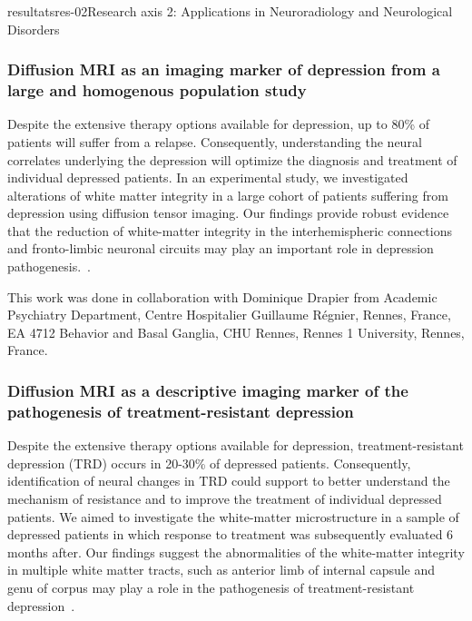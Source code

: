 \documentclass{ra2018}
\begin{document}
\begin{module}{resultats}{res-02}{Research axis 2: Applications in Neuroradiology and Neurological Disorders}
\subsubsection{Diffusion MRI as an imaging marker of depression from a large and homogenous population study}
\begin{participants}
\end{participants}
Despite the extensive therapy options available for depression, up to 80\% of patients will suffer from a relapse. Consequently, understanding the neural correlates underlying the depression will optimize the diagnosis and treatment of individual depressed patients. In an experimental study, we investigated alterations of white matter integrity in a large cohort of patients suffering from depression using diffusion tensor imaging. Our findings provide robust evidence that the reduction of white-matter integrity in the interhemispheric connections and fronto-limbic neuronal circuits may play an important role in depression pathogenesis.~\cite{coloigner:hal-01812093}. 

This work was done in collaboration with Dominique Drapier from Academic Psychiatry Department, Centre Hospitalier Guillaume Régnier, Rennes, France, EA 4712 Behavior and Basal Ganglia, CHU Rennes, Rennes 1 University, Rennes, France.

\subsubsection{Diffusion MRI as a descriptive imaging marker of the pathogenesis of treatment-resistant depression}
\begin{participants}
\end{participants}
Despite the extensive therapy options available for depression, treatment-resistant depression (TRD) occurs in 20-30\% of depressed patients. Consequently, identification of neural changes in TRD could support to better understand the mechanism of resistance and to improve the treatment of individual depressed patients. We aimed to investigate the white-matter microstructure in a sample of depressed patients in which response to treatment was subsequently evaluated 6 months after. Our findings suggest the abnormalities of the white-matter integrity in multiple white matter tracts, such as anterior limb of internal capsule and genu of corpus may play a role in the pathogenesis of treatment-resistant depression~\cite{coloigner:hal-01812087}.


\end{module}
\end{document}
